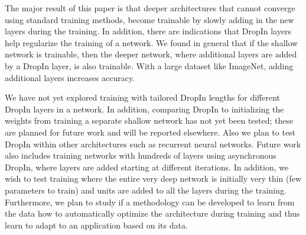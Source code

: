 \documentclass[10pt,twocolumn,letterpaper]{article}
\newcommand{\dropin}{DropIn }
\newcommand{\dropinNS}{DropIn}
\begin{document}
The major result of this paper is that deeper architectures that cannot converge using standard training methods, become trainable by slowly adding in the new layers during the training.  
In addition, there are indications that  \dropin layers help regularize the training of a network. 
We found in general that if the shallow network is trainable, then the deeper network, where  additional layers are added by a \dropin layer, is also trainable.  
With a large dataset like ImageNet, adding additional layers increases accuracy.

We have not yet explored training with tailored \dropin lengths for different \dropin layers in a network.
In addition, comparing \dropin to initializing the weights from training a separate shallow network has not yet been tested; these are planned for future work and will be reported elsewhere.  
Also we plan to test \dropin within other architectures such as recurrent neural networks.
Future work also includes training networks with hundreds of layers using asynchronous \dropinNS, where layers are added starting at different iterations.
In addition, we wish to test training where the entire very deep network is initially very thin (few parameters to train) and units are added to all the layers during the training.
Furthermore, we plan to study if a methodology can be developed to learn from the data how to automatically optimize the architecture during training and thus learn to adapt to an application based on its data.



{\small


}
\end{document}
